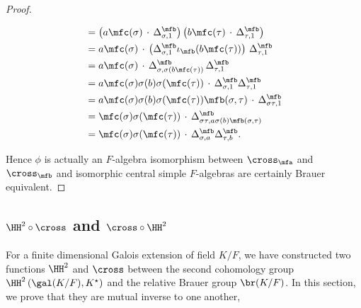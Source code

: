 \begin{proof}
\begin{enumerate}
\[\begin{aligned}
              &= \left(
                a\mfc(\sigma)
                \, \cdot \,
                \Delta^{\mfb}_{\sigma, 1}
                \right)
                \left(
                b \mfc(\tau)
                \, \cdot \,
                \Delta^{\mfb}_{\tau, 1}
                \right)\\
              &= a\mfc(\sigma) \, \cdot \,
                \left(\Delta^{\mfb}_{\sigma, 1}
                \iota_{\mfb}(b\mfc(\tau))\right) \,
                \Delta^{\mfb}_{\tau, 1} \\
              &=
                a\mfc(\sigma) \, \cdot \,
                \Delta^{\mfb}_{\sigma, \sigma(b\mfc(\tau))}\,
                \Delta^{\mfb}_{\tau, 1} \\
              &= a\mfc(\sigma)\sigma(b)\sigma(\mfc(\tau)) \, \cdot \,
                \Delta^{\mfb}_{\sigma, 1}\Delta_{\tau, 1}^{\mfb}\\
              &= a\mfc(\sigma)\sigma(b)\sigma(\mfc(\tau))\mfb(\sigma,\tau) \, \cdot \, \Delta^{\mfb}_{\sigma\tau, 1}\\
              &= \mfc(\sigma)\sigma(\mfc(\tau)) \, \cdot \, \Delta^{\mfb}_{\sigma\tau, a\sigma(b)\mfb(\sigma,\tau)}\\
              &= \mfc(\sigma)\sigma(\mfc(\tau)) \, \cdot \, \Delta^{\mfb}_{\sigma, a}\Delta^{\mfb}_{\tau, b}.
            \end{aligned}
            \]
    \end{enumerate}
    Hence $\phi$ is actually an $F$-algebra isomorphism between $\cross_{\mfa}$ and $\cross_{\mfb}$ and isomorphic central simple $F$-algebras are certainly Brauer equivalent.
  \end{proof}





\subsection{$\HH^{2} \circ \cross$ and $\cross \circ \HH^{2}$}

For a finite dimensional Galois extension of field $K/F$, we have constructed two functions $\HH^{2}$ and $\cross$ between the second cohomology group $\HH^{2}\left(\gal(K/F), K^{\star}\right)$ and the relative Brauer group $\br(K/F)$. In this section, we prove that they are mutual inverse to one another,

